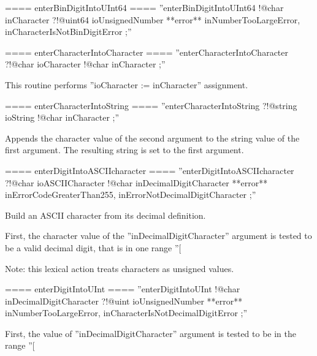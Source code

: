 ==== enterBinDigitIntoUInt64 ====
''enterBinDigitIntoUInt64 !@char inCharacter ?!@uint64 ioUnsignedNumber **error** inNumberTooLargeError, inCharacterIsNotBinDigitError ;''

==== enterCharacterIntoCharacter ====
''enterCharacterIntoCharacter ?!@char ioCharacter !@char inCharacter ;''

This routine performs ''ioCharacter := inCharacter'' assignment.

==== enterCharacterIntoString ====
''enterCharacterIntoString ?!@string ioString !@char inCharacter ;''

Appends the character value of the second argument to the string value of the first argument. The resulting string is set to the first argument.

==== enterDigitIntoASCIIcharacter ====
''enterDigitIntoASCIIcharacter ?!@char ioASCIICharacter !@char inDecimalDigitCharacter **error** inErrorCodeGreaterThan255, inErrorNotDecimalDigitCharacter ;''

Build an ASCII character from its decimal definition.

First, the character value of the ''inDecimalDigitCharacter'' argument is tested to be a valid decimal digit, that is in one range ''[%

Note: this lexical action treats characters as unsigned values.

==== enterDigitIntoUInt ====
''enterDigitIntoUInt !@char inDecimalDigitCharacter ?!@uint ioUnsignedNumber **error** inNumberTooLargeError, inCharacterIsNotDecimalDigitError ;''

First, the value of ''inDecimalDigitCharacter'' argument is tested to be in the range ''[%

